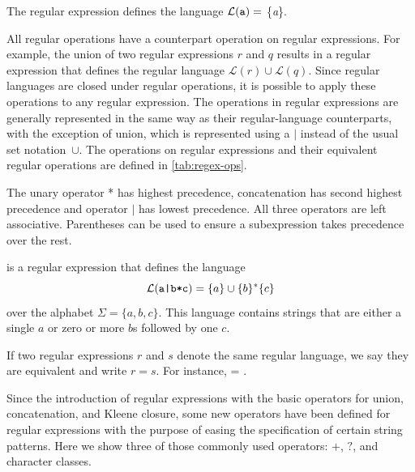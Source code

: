 \begin{example}
The regular expression  defines the language \(\mathcal{L}({\texttt{a}}) =\) \{\textit{a}\}.
\end{example}{}



All regular operations have a counterpart operation on regular expressions. For example, the union of two regular expressions \(r\) and \(q\) results in a regular expression that defines the regular language \(\mathcal{L}(r) \cup \mathcal{L}(q)\). 
Since regular languages are closed under regular operations, it is possible to apply these operations to any regular expression.
The operations in regular expressions are generally represented in the same way as their regular-language counterparts, with the exception of union, which is represented using a \(|\) instead of the usual set notation~\(\cup\). The operations on regular expressions and their equivalent regular operations  are defined in \autoref{tab:regex-ops}.

The unary operator * has highest precedence, concatenation has second highest precedence and operator \(|\) has lowest precedence.
All three operators are left associative. Parentheses can be used to ensure a subexpression takes precedence over the rest.

\begin{example}
 is a regular expression that defines the language
\[\mathcal{L}(\texttt{a|b*c}) = \{a\} \cup \{b\}^* \{c\}\]
over the alphabet \(\Sigma = \{a, b, c\}\). This language contains strings that are either a single \(a\) or zero or more \(b\)s followed by one \(c\).
\end{example}

If two regular expressions \(r\) and \(s\) denote the same regular language, we say they are equivalent and write \(r = s\). For instance,  = . %

% 

\medskip
Since the introduction of regular expressions with the basic operators for union, concatenation, and Kleene closure, some new operators have been defined for regular expressions with the purpose of easing the specification of certain string patterns. Here we show three of those commonly used operators: \(+\), \(?\), and character classes.

